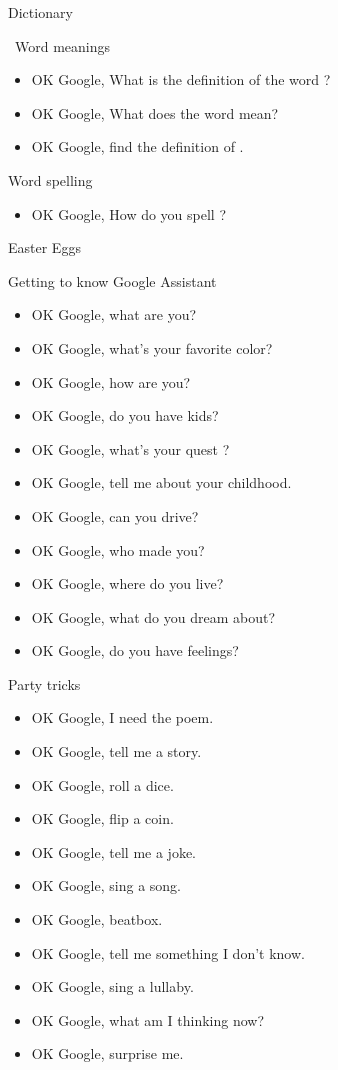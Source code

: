 \documentclass[
  a4paper,
]{article}
\providecommand{\tightlist}{%
  \setlength{\itemsep}{0pt}\setlength{\parskip}{0pt}}\usepackage{longtable,booktabs,array}
\begin{document}
Dictionary

~Word meanings

\begin{itemize}
\tightlist
\item
  OK Google, What is the definition of the word ?
\item
  OK Google, What does the word mean?
\item
  OK Google, find the definition of .
\end{itemize}

Word spelling

\begin{itemize}
\tightlist
\item
  OK Google, How do you spell ?
\end{itemize}

Easter Eggs

Getting to know Google Assistant

\begin{itemize}
\item
  OK Google, what are you?
\item
  OK Google, what's your favorite color?
\item
  OK Google, how are you?
\item
  OK Google, do you have kids?
\item
  OK Google, what's your quest ?
\item
  OK Google, tell me about your childhood.
\item
  OK Google, can you drive?
\item
  OK Google, who made you?
\item
  OK Google, where do you live?
\item
  OK Google, what do you dream about?
\item
  OK Google, do you have feelings?
\end{itemize}

Party tricks

\begin{itemize}
\item
  OK Google, I need the poem.
\item
  OK Google, tell me a story.
\item
  OK Google, roll a dice.
\item
  OK Google, flip a coin.
\item
  OK Google, tell me a joke.
\item
  OK Google, sing a song.
\item
  OK Google, beatbox.
\item
  OK Google, tell me something I don't know.
\item
  OK Google, sing a lullaby.
\item
  OK Google, what am I thinking now?
\item
  OK Google, surprise me.
\end{itemize}
\end{document}
